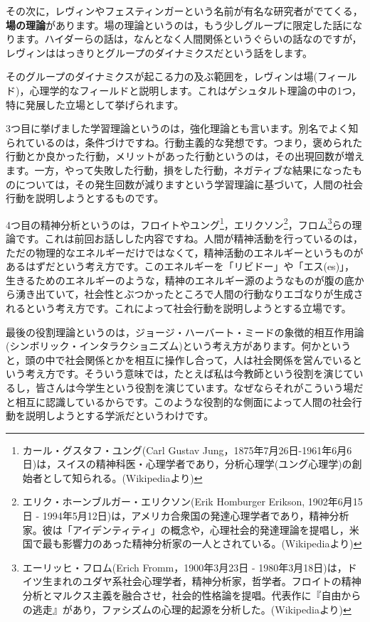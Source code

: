 \documentclass{ltjsbook}
\begin{document}
その次に，レヴィンやフェスティンガーという名前が有名な研究者がでてくる，\textbf{場の理論}があります。場の理論というのは，もう少しグループに限定した話になります。ハイダーらの話は，なんとなく人間関係というぐらいの話なのですが，レヴィンははっきりとグループのダイナミクスだという話をします。

そのグループのダイナミクスが起こる力の及ぶ範囲を，レヴィンは場(フィールド)，心理学的なフィールドと説明します。これはゲシュタルト理論の中の1つ，特に発展した立場として挙げられます。

3つ目に挙げました学習理論というのは，強化理論とも言います。別名でよく知られているのは，条件づけですね。行動主義的な発想です。つまり，褒められた行動とか良かった行動，メリットがあった行動というのは，その出現回数が増えます。一方，やって失敗した行動，損をした行動，ネガティブな結果になったものについては，その発生回数が減りますという学習理論に基づいて，人間の社会行動を説明しようとするものです。

4つ目の精神分析というのは，フロイトやユング\footnote{カール・グスタフ・ユング(Carl Gustav Jung，1875年7月26日-1961年6月6日)は，スイスの精神科医・心理学者であり，分析心理学(ユング心理学)の創始者として知られる。(Wikipediaより)}，エリクソン\footnote{エリク・ホーンブルガー・エリクソン(Erik Homburger Erikson, 1902年6月15日 - 1994年5月12日)は，アメリカ合衆国の発達心理学者であり，精神分析家。彼は「アイデンティティ」の概念や，心理社会的発達理論を提唱し，米国で最も影響力のあった精神分析家の一人とされている。(Wikipediaより)}，フロム\footnote{エーリッヒ・フロム(Erich Fromm，1900年3月23日 - 1980年3月18日)は，ドイツ生まれのユダヤ系社会心理学者，精神分析家，哲学者。フロイトの精神分析とマルクス主義を融合させ，社会的性格論を提唱。代表作に『自由からの逃走』があり，ファシズムの心理的起源を分析した。(Wikipediaより)}らの理論です。これは前回お話しした内容ですね。人間が精神活動を行っているのは，ただの物理的なエネルギーだけではなくて，精神活動のエネルギーというものがあるはずだという考え方です。このエネルギーを「リビドー」や「エス(es)」，生きるためのエネルギーのような，精神のエネルギー源のようなものが腹の底から湧き出ていて，社会性とぶつかったところで人間の行動なりエゴなりが生成されるという考え方です。これによって社会行動を説明しようとする立場です。

最後の役割理論というのは，ジョージ・ハーバート・ミードの象徴的相互作用論(シンボリック・インタラクショニズム)という考え方があります。何かというと，頭の中で社会関係とかを相互に操作し合って，人は社会関係を営んでいるという考え方です。そういう意味では，たとえば私は今教師という役割を演じているし，皆さんは今学生という役割を演じています。なぜならそれがこういう場だと相互に認識しているからです。このような役割的な側面によって人間の社会行動を説明しようとする学派だというわけです。
\end{document}
